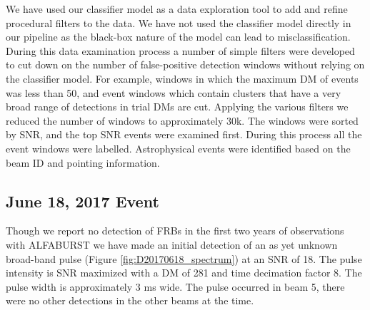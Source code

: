 \documentclass[a4paper,fleqn,usenatbib]{mnras}
\begin{document}
We have used our classifier model as a data exploration tool to add and refine
procedural filters to the data. We have not used the classifier model directly
in our pipeline as the black-box nature of the model can lead to
misclassification.  During this data examination process a number of simple
filters were developed to cut down on the number of false-positive detection
windows without relying on the classifier model. For example, windows in which
the maximum DM of events was less than 50, and event windows which contain
clusters that have a very broad range of detections in trial DMs are cut.
Applying the various filters we reduced the number of windows to approximately
30k. The windows were sorted by SNR, and the top SNR events were examined first.
During this process all the event windows were labelled. Astrophysical events
were identified based on the beam ID and pointing information.


\subsection{June 18, 2017 Event}
\label{sec:18062017}

Though we report no detection of FRBs in the first two years of observations
with ALFABURST we have made an initial detection of an as yet unknown broad-band
pulse (Figure \ref{fig:D20170618_spectrum}) at an SNR of 18. The pulse intensity
is SNR maximized with a DM of 281 and time decimation factor 8. The pulse width
is approximately 3 ms wide. The pulse occurred in beam 5, there were no other
detections in the other beams at the time.
\end{document}
